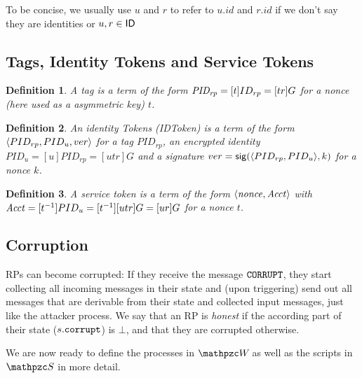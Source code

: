 \documentclass[letterpaper,onecolumn,10pt]{article}
\newtheorem{definition}{Definition}
\begin{document}
To be concise, we usually use $u$ and $r$ to
refer to $u.id$ and $r.id$ if we don't say they are identities or $u,r\in\mathsf{ID}$

\subsection{Tags, Identity Tokens and Service Tokens}\label{app:identity-assertions}

\begin{definition}\label{def:tag}
  A \emph{tag} is a term of the form $\mathit{PID_{rp}}=[t]ID_{rp}=[tr]G$ for a nonce 
  (here used as a asymmetric key) $t$.
\end{definition}
\begin{definition}
  An \emph{identity Tokens (IDToken)} is a term of the form 
  $\langle PID_{rp}, PID_u, ver\rangle$ for a tag $PID_{rp}$, an encrypted identity 
  $PID_u=[u]PID_{rp}=[utr]G$ and a signature $ver=\mathsf{sig}({\langle PID_{rp},PID_u\rangle},{k})$ 
  for a nonce $k$.
\end{definition}
\begin{definition}
  A \emph{service token} is a term of the form 
  $\langle {{}\mathit{nonce}, \mathit{Acct}} \rangle$ with 
  $\mathit{Acct} = [t^{-1}]PID_u=[t^{-1}][utr]G=[ur]G$ 
  for a nonce $t$.
\end{definition}


\subsection{Corruption}
RPs can become corrupted: If they receive the message
$\mathtt{CORRUPT}$, they start collecting all incoming messages in their state
and (upon triggering) send out all messages that are derivable from
their state and collected input messages, just like the attacker
process. We say that an RP is \emph{honest} if the according
part of their state ($s.\mathtt{corrupt}$) is $\bot$, and that they are
corrupted otherwise.

We are now ready to define the processes in $\websystem$ as well as
the scripts in $\scriptset$ in more detail. 
\end{document}
